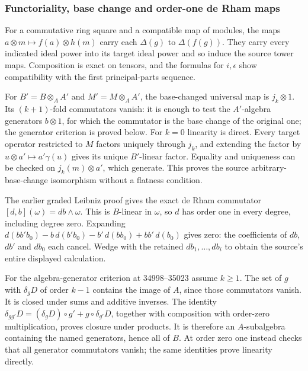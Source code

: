 \subsubsection{Functoriality, base change and order-one de Rham maps}\label{algebra-proof-043-functoriality-base-change-and-order-one-de-rham-maps}

For a commutative ring square and a compatible map of modules, the maps \(a\otimes m\mapsto f(a)\otimes h(m)\) carry each \(\Delta(g)\) to \(\Delta(f(g))\). They carry every indicated ideal power into its target ideal power and so induce the source tower maps. Composition is exact on tensors, and the formulas for \(i,\epsilon\) show compatibility with the first principal-parts sequence.

For \(B'=B\otimes_A A'\) and \(M'=M\otimes_A A'\), the base-changed universal map is \(j_k\otimes1\). Its \((k+1)\)-fold commutators vanish: it is enough to test the \(A'\)-algebra generators \(b\otimes1\), for which the commutator is the base change of the original one; the generator criterion is proved below. For \(k=0\) linearity is direct. Every target operator restricted to \(M\) factors uniquely through \(j_k\), and extending the factor by \(u\otimes a'\mapsto a'\gamma(u)\) gives its unique \(B'\)-linear factor. Equality and uniqueness can be checked on \(j_k(m)\otimes a'\), which generate. This proves the source arbitrary-base-change isomorphism without a flatness condition.

The earlier graded Leibniz proof gives the exact de Rham commutator \([d,b](\omega)=db\wedge\omega\). This is \(B\)-linear in \(\omega\), so \(d\) has order one in every degree, including degree zero. Expanding \(d(bb'b_0)-b\,d(b'b_0)-b'\,d(bb_0)+bb'\,d(b_0)\) gives zero: the coefficients of \(db\), \(db'\) and \(db_0\) each cancel. Wedge with the retained \(db_1,\ldots,db_i\) to obtain the source's entire displayed calculation.

For the algebra-generator criterion at 34998--35023 assume \(k\ge1\). The set of \(g\) with \(\delta_gD\) of order \(k-1\) contains the image of \(A\), since those commutators vanish. It is closed under sums and additive inverses. The identity \(\delta_{gg'}D=(\delta_gD)\circ g'+g\circ\delta_{g'}D\), together with composition with order-zero multiplication, proves closure under products. It is therefore an \(A\)-subalgebra containing the named generators, hence all of \(B\). At order zero one instead checks that all generator commutators vanish; the same identities prove linearity directly.

